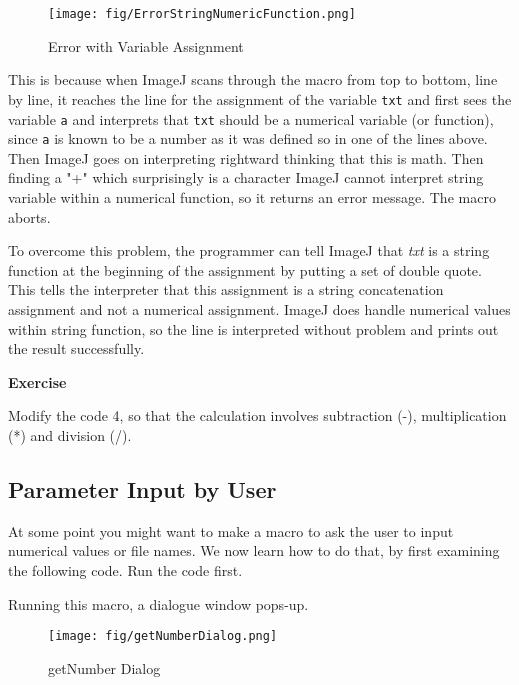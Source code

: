 \documentclass[11pt,a4paper,oneside]{report}
\newenvironment{indentexercise}[1]%
{{\setlength{\leftmargin}{2em}}%
\textbf{Exercise \thesubsection-#1}%
\begin{list}{}%
	\item%
}
{\end{list}}
\newcommand{\ilcom}[1]{\texttt{\small#1}}
\begin{document}
\begin{figure}[htbp]
\begin{center}
\texttt{[image: fig/ErrorStringNumericFunction.png]}
\caption{Error with Variable Assignment} \label{fig_ErrorVariable}
\end{center}
\end{figure}

This is because when ImageJ scans through the macro from top to bottom, line by line, 
it reaches the line for the assignment of the variable \ilcom{txt} and first sees the variable \ilcom{a} and interprets that \ilcom{txt} should be a numerical variable 
(or function), since \ilcom{a} is known to be a number as it was defined so in one of the lines above. Then ImageJ goes on interpreting rightward thinking that this is math. Then finding a "+" which surprisingly is a character
ImageJ cannot interpret string variable within a numerical function, so it returns an error message. The macro aborts.  

To overcome this problem, the programmer can tell ImageJ that 
\textit{txt} is a string function at the beginning of the assignment 
by putting a set of double quote. This tells the interpreter that this assignment is a string concatenation assignment and not a numerical assignment. 
ImageJ does handle numerical values within string function, 
so the line is interpreted without problem and prints out the result successfully.  

\begin{indentexercise}{2}
Modify the code 4, so that the calculation involves subtraction (-), multiplication (*) and division (/). 
\end{indentexercise}

\subsection{Parameter Input by User}
At some point you might want to make a macro to ask the user to input numerical
values or file names. We now learn how to do that, by first examining the
following code. Run the code first.

Running this macro,  a dialogue window pops-up.

\begin{figure}[htbp]
\begin{center}
\texttt{[image: fig/getNumberDialog.png]}
\caption{getNumber Dialog} \label{fig_getNUmber}
\end{center}
\end{figure}
\end{document}
